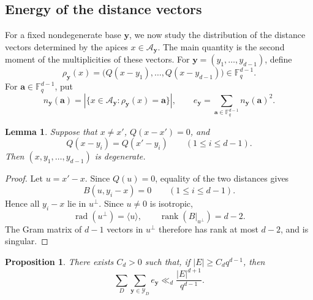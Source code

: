 \documentclass[11pt]{article}
\newtheorem{proposition}[theorem]{Proposition}
\newtheorem{lemma}[theorem]{Lemma}
\theoremstyle{remark}
\numberwithin{equation}{section}
\newcommand{\Fq}{\mathbb F_q}
\newcommand{\cY}{\mathcal Y}
\newcommand{\cA}{\mathcal A}
\newcommand{\rank}{\operatorname{rank}}
\newcommand{\rad}{\operatorname{rad}}
\newcommand{\1}{\mathbf 1}
\begin{document}
\subsection{Energy of the distance vectors}

For a fixed nondegenerate base \(\mathbf y\), we now study the distribution of the distance vectors determined by the apices \(x\in\cA_{\mathbf y}\). The main quantity is the second moment of the multiplicities of these vectors. For $\mathbf y=(y_1,\ldots,y_{d-1})$, define
\[
 \rho_{\mathbf y}(x)
 =
 \bigl(Q(x-y_1),\ldots,Q(x-y_{d-1})\bigr)
 \in\Fq^{d-1}.
\]
For \(\mathbf a\in\Fq^{d-1}\), put
\[
 n_{\mathbf y}(\mathbf a)
 =
 |\{x\in\cA_{\mathbf y}:
       \rho_{\mathbf y}(x)=\mathbf a\}|,
 \qquad
 e_{\mathbf y}
 =
 \sum_{\mathbf a\in\Fq^{d-1}}
 n_{\mathbf y}(\mathbf a)^2.
\]

\begin{lemma}
\label{lem:isotropic-pairs}
Suppose that \(x\ne x'\), \(Q(x-x')=0\), and
\[
        Q(x-y_i)=Q(x'-y_i)
        \qquad
        (1\le i\le d-1).
\]
Then \((x,y_1,\ldots,y_{d-1})\) is degenerate.
\end{lemma}

\begin{proof}
Let $u=x'-x$. Since \(Q(u)=0\), equality of the two distances gives
\[
        B(u,y_i-x)=0
        \qquad
        (1\le i\le d-1).
\]
Hence all \(y_i-x\) lie in \(u^\perp\). Since \(u\ne0\) is isotropic,
\[
        \rad(u^\perp)=\langle u\rangle,
        \qquad
        \rank(B|_{u^\perp})=d-2.
\]
The Gram matrix of \(d-1\) vectors in \(u^\perp\) therefore has rank at most \(d-2\), and is singular.
\end{proof}

\begin{proposition} 
\label{prop:distance-energy}
There exists \(C_d>0\) such that, if \(|E|\ge C_dq^{d-1}\), then
\[
        \sum_D\sum_{\mathbf y\in\cY_D}e_{\mathbf y}
        \ll_d
        \frac{|E|^{d+1}}{q^{d-1}}.
\]
\end{proposition}
\end{document}
